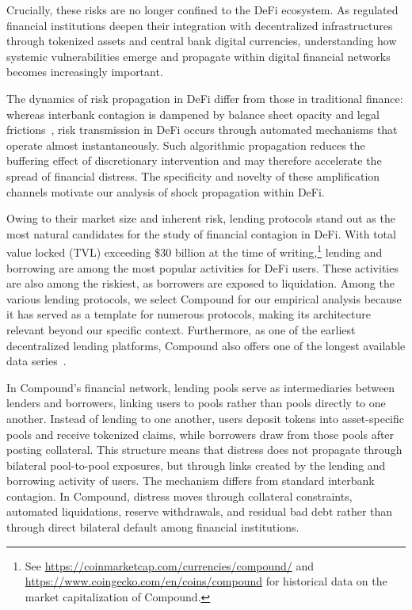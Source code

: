 \documentclass[a4paper,UKenglish,cleveref, autoref, thm-restate]{informs3}
\DeclareRobustCommand{\latestrev}[1]{{\color{red}\hypersetup{linkcolor=red,citecolor=red,urlcolor=red}#1}}
\begin{document}
Crucially, these risks are no longer confined to the DeFi ecosystem. As regulated financial institutions deepen their integration with decentralized infrastructures through tokenized assets and central bank digital currencies, understanding how systemic vulnerabilities emerge and propagate within digital financial networks becomes increasingly important.

The dynamics of risk propagation in DeFi differ from those in traditional finance: whereas interbank contagion is dampened by balance sheet opacity and legal frictions~\citep{Gennaioli2013ShadowBanking}, risk transmission in DeFi occurs through automated mechanisms that operate almost instantaneously. Such algorithmic propagation reduces the buffering effect of discretionary intervention and may therefore accelerate the spread of financial distress. The specificity and novelty of these amplification channels motivate our analysis of shock propagation within DeFi.

Owing to their market size and inherent risk, lending protocols stand out as the most  natural candidates for the study of financial contagion in DeFi. With total value locked (TVL) exceeding \$30 billion at the time of writing,\footnote{See \url{https://coinmarketcap.com/currencies/compound/} 
and \url{https://www.coingecko.com/en/coins/compound} for historical data on the market 
capitalization of Compound.} lending and borrowing are among the most popular activities for DeFi users. These  activities are also among the riskiest, as borrowers are exposed to liquidation. Among  the various lending protocols, we select Compound for our empirical analysis because it 
has served as a template for numerous protocols, making its architecture relevant beyond our specific context. Furthermore, as one of the earliest decentralized lending platforms, Compound also offers one of the longest available data series~\citep{leshner2019compound}.

In Compound’s financial network, lending pools serve as intermediaries between lenders and borrowers, \latestrev{linking users to pools rather than pools directly to one another}. Instead of lending to one another, users deposit tokens into asset-specific pools and receive tokenized claims, while borrowers draw from those pools after posting collateral. This structure means that distress does not propagate through bilateral pool-to-pool exposures, but through links created by the lending and borrowing activity of users. The mechanism differs from standard interbank contagion. In Compound, distress moves through collateral constraints, automated liquidations, reserve withdrawals, and residual bad debt rather than through direct bilateral default among financial institutions.
\end{document}
